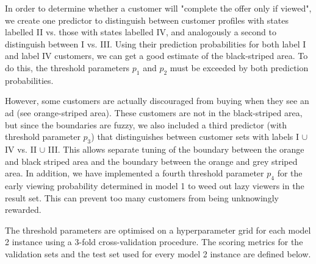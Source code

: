 \documentclass[11pt]{article} %
\begin{document}
In order to determine whether a customer will "complete the offer only if viewed", we create one predictor to distinguish between customer profiles with states labelled II vs. those with states labelled IV, and analogously a second to distinguish between I vs. III.
Using their prediction probabilities for both label I and label IV customers, we can get a good estimate of the black-striped area. To do this, the threshold parameters $p_1$ and $p_2$ must be exceeded by both prediction probabilities.


However, some customers are actually discouraged from buying when they see an ad (see orange-striped area). These customers are not in the black-striped area, but since the boundaries are fuzzy, we
also included a third predictor (with threshold parameter $p_3$) that distinguishes between customer sets with labels I $\cup$ IV vs. II $\cup$ III. This allows separate tuning of the boundary between the orange and black striped area and the boundary between the orange and grey striped area. In addition, we have implemented a fourth threshold parameter $p_4$ for the early viewing probability determined in model 1 to weed out lazy viewers in the result set.
This can prevent too many customers from being unknowingly rewarded.

The threshold parameters are optimised on a hyperparameter grid for each model 2 instance using a 3-fold cross-validation procedure.
The scoring metrics for the validation sets and the test set used for every model 2 instance are defined below.
\end{document}
